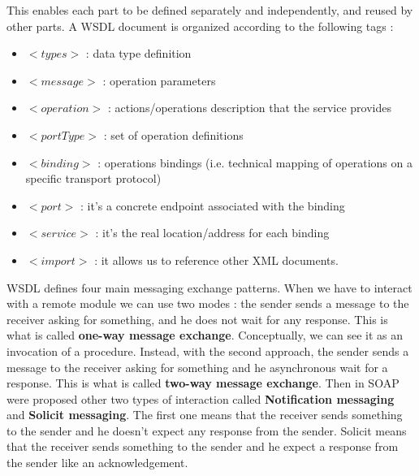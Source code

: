 \documentclass[11pt]{article}
\begin{document}
This enables each part to be defined separately and independently, and reused by other parts. A WSDL document is organized according to the following tags :
\begin{itemize}
\item $<types>$ : data type definition
\item $<message>$ : operation parameters
\item $<operation>$ : actions/operations description that the service provides
\item $<portType>$ : set of operation definitions
\item $<binding>$ : operations bindings (i.e. technical mapping of operations on a specific transport protocol)
\item $<port>$ : it's a concrete endpoint associated with the binding
\item $<service>$ : it's the real location/address for each binding
\item $<import>$ : it allows us to reference other XML documents.
\end{itemize}
WSDL defines four main messaging exchange patterns. When we have to interact with a remote module we can use two modes : the sender sends a message to the receiver asking for something, and he does not wait for any response. This is what is called \textbf{one-way message exchange}. Conceptually, we can see it as an invocation of a procedure. Instead, with the second approach, the sender sends a message to the receiver asking for something and he asynchronous wait for a response. This is what is called \textbf{two-way message exchange}. Then in SOAP were proposed other two types of interaction called \textbf{Notification messaging} and \textbf{Solicit messaging}. The first one means that the receiver sends something to the sender and he doesn't expect any response from the sender. Solicit means that the receiver sends something to the sender and he expect a response from the sender like an acknowledgement. 
\end{document}
